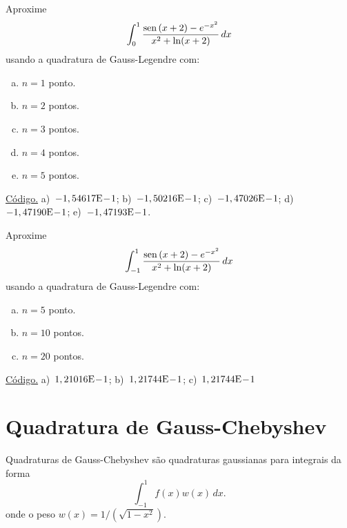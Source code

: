 \begin{exer}\label{exer:GL_mudvar}
  Aproxime
  \begin{equation}
    \int_{0}^1 \frac{\operatorname{sen}\,(x+2)-e^{-x^2}}{x^2+\ln(x+2)}\,dx
  \end{equation}
usando a quadratura de Gauss-Legendre com:
\begin{enumerate}[a)]
\item $n=1$ ponto.
\item $n=2$ pontos.
\item $n=3$ pontos.
\item $n=4$ pontos.
\item $n=5$ pontos.
\end{enumerate}
\end{exer}
\begin{resp}
  \ifisoctave 
  \href{https://github.com/phkonzen/notas/blob/master/src/MatematicaNumerica/cap_integr/dados/exer_GL_mudvar/exer_GL_mudvar.m}{Código.} 
  \fi
  a)~$-1,54617\mathrm{E}\!-\!1$; b)~$-1,50216\mathrm{E}\!-\!1$; c)~$-1,47026\mathrm{E}\!-\!1$; d)~$-1,47190\mathrm{E}\!-\!1$; e)~$-1,47193\mathrm{E}\!-\!1$.
\end{resp}

\begin{exer}\label{exer:GL_Npts}
  Aproxime
  \begin{equation}
    \int_{-1}^1 \frac{\operatorname{sen}\,(x+2)-e^{-x^2}}{x^2+\ln(x+2)}\,dx
  \end{equation}
usando a quadratura de Gauss-Legendre com:
\begin{enumerate}[a)]
\item $n=5$ ponto.
\item $n=10$ pontos.
\item $n=20$ pontos.
\end{enumerate}
\end{exer}
\begin{resp}
  \ifisoctave 
  \href{https://github.com/phkonzen/notas/blob/master/src/MatematicaNumerica/cap_integr/dados/exer_GL_Npts/exer_GL_Npts.m}{Código.} 
  \fi
  a)~$1,21016\mathrm{E}\!-\!1$; b)~$1,21744\mathrm{E}\!-\!1$; c)~$1,21744\mathrm{E}\!-\!1$
\end{resp}

\section{Quadratura de Gauss-Chebyshev}\label{cap_integr_sec_Gauss-Chebyshev}

Quadraturas de Gauss-Chebyshev são quadraturas gaussianas para integrais da forma
\begin{equation}
  \int_{-1}^1 f(x)w(x)\,dx.
\end{equation}
onde o peso $w(x)=1/(\sqrt{1-x^2})$.

